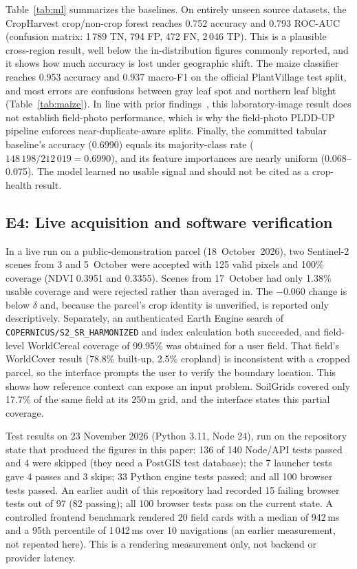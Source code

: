 \documentclass[conference]{IEEEtran}
\begin{document}
Table~\ref{tab:ml} summarizes the baselines. On entirely unseen source datasets, the CropHarvest crop/non-crop forest reaches 0.752 accuracy and 0.793 ROC-AUC (confusion matrix: 1\,789 TN, 794 FP, 472 FN, 2\,046 TP). This is a plausible cross-region result, well below the in-distribution figures commonly reported, and it shows how much accuracy is lost under geographic shift. The maize classifier reaches 0.953 accuracy and 0.937 macro-F1 on the official PlantVillage test split, and most errors are confusions between gray leaf spot and northern leaf blight (Table~\ref{tab:maize}). In line with prior findings~\cite{mohanty2016,barbedo2018}, this laboratory-image result does not establish field-photo performance, which is why the field-photo PLDD-UP pipeline enforces near-duplicate-aware splits. Finally, the committed tabular baseline's accuracy (0.6990) equals its majority-class rate ($148\,198/212\,019=0.6990$), and its feature importances are nearly uniform (0.068--0.075). The model learned no usable signal and should not be cited as a crop-health result.

\subsection{E4: Live acquisition and software verification}
In a live run on a public-demonstration parcel (18~October~2026), two Sentinel-2 scenes from 3 and 5~October were accepted with 125 valid pixels and 100\% coverage (NDVI 0.3951 and 0.3355). Scenes from 17~October had only 1.38\% usable coverage and were rejected rather than averaged in. The $-0.060$ change is below $\delta$ and, because the parcel's crop identity is unverified, is reported only descriptively. Separately, an authenticated Earth Engine search of \texttt{COPERNICUS/S2\_SR\_HARMONIZED} and index calculation both succeeded, and field-level WorldCereal coverage of 99.95\% was obtained for a user field. That field's WorldCover result (78.8\% built-up, 2.5\% cropland) is inconsistent with a cropped parcel, so the interface prompts the user to verify the boundary location. This shows how reference context can expose an input problem. SoilGrids covered only 17.7\% of the same field at its 250\,m grid, and the interface states this partial coverage.

Test results on 23 November 2026 (Python 3.11, Node 24), run on the repository state that produced the figures in this paper: 136 of 140 Node/API tests passed and 4 were skipped (they need a PostGIS test database); the 7 launcher tests gave 4 passes and 3 skips; 33 Python engine tests passed; and all 100 browser tests passed. An earlier audit of this repository had recorded 15 failing browser tests out of 97 (82 passing); all 100 browser tests pass on the current state. A controlled frontend benchmark rendered 20 field cards with a median of 942\,ms and a 95th percentile of 1\,042\,ms over 10 navigations (an earlier measurement, not repeated here). This is a rendering measurement only, not backend or provider latency.
\end{document}
